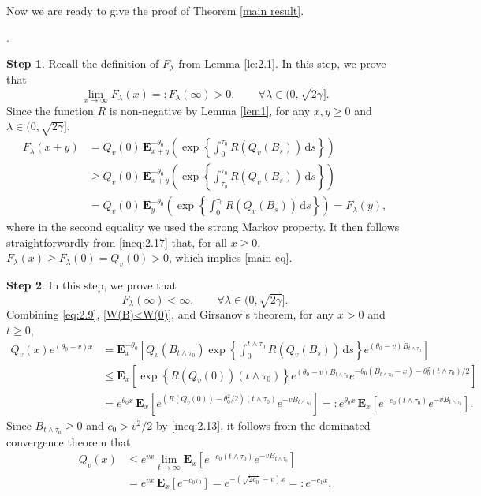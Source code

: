\documentclass[10pt,a4paper]{amsart}
\numberwithin{equation}{section}
\begin{document}
\bigskip 
Now we are ready to give the proof of Theorem \ref{main result}.
\bigskip 


. 

{\bf Step 1}. 
Recall the definition of $F_\lambda$ from Lemma \ref{le:2.1}. In this step, we prove that
\begin{equation}\label{main eq}
	\lim_{x \to \infty} F_\lambda(x) =: F_\lambda(\infty) > 0, \qquad \forall \lambda \in (0, \sqrt{2\gamma}].
\end{equation}
Since the function $R$ is non-negative by Lemma \ref{lem1}, for any $x, y \ge 0$ and $\lambda \in (0, \sqrt{2\gamma}]$,
\begin{align}\label{ineq:2.17}
	F_\lambda(x + y)
	&= Q_v(0) \, \mathbf E_{x+y}^{-\theta_0} \left( \exp\left\{ \int_0^{\tau_0} R(Q_v(B_s)) \, \mathrm{d}s \right\} \right) \nonumber \\
	&\ge Q_v(0) \, \mathbf E_{x+y}^{-\theta_0} \left( \exp\left\{ \int_{\tau_y}^{\tau_0} R(Q_v(B_s)) \, \mathrm{d}s \right\} \right) \nonumber \\
	&= Q_v(0) \, \mathbf E_y^{-\theta_0} \left( \exp\left\{ \int_0^{\tau_0} R(Q_v(B_s)) \, \mathrm{d}s \right\} \right) = F_\lambda(y),
\end{align}
where in the second equality we used the strong Markov property. It then follows straightforwardly from \eqref{ineq:2.17} that, for all $x \ge 0$, $F_\lambda(x) \ge F_\lambda(0) = Q_v(0) > 0$, which implies \eqref{main eq}.

{\bf Step 2}. In this step, we prove that
\begin{equation}\label{main eq2}
	F_\lambda(\infty) < \infty, \qquad \forall \lambda \in (0, \sqrt{2\gamma}].
\end{equation}
Combining \eqref{eq:2.9}, \eqref{W(B)<W(0)}, and Girsanov's theorem, for any $x > 0$ and $t \ge 0$,
\begin{align*}
	Q_v(x)
	 e^{(\theta_0 - v)x}
	&= \mathbf E_x^{-\theta_0}
	\left[
	Q_v(B_{t \wedge \tau_0}) \exp\left\{ \int_0^{t \wedge \tau_0} R(Q_v(B_s)) \, \mathrm{d}s \right\}
	e^{(\theta_0 - v) B_{t \wedge \tau_0}}
	\right] \nonumber \\
	&\le \mathbf E_x
	\left[
	\exp\left\{ R(Q_v(0)) (t \wedge \tau_0) \right\}
	e^{(\theta_0 - v) B_{t \wedge \tau_0}}
	e^{-\theta_0 (B_{t \wedge \tau_0} - x) - \theta_0^2 (t \wedge \tau_0)/2}
	\right] \nonumber \\
	&= e^{\theta_0 x} \, \mathbf E_x
	\left[ e^{(R(Q_v(0)) - \theta_0^2/2)(t \wedge \tau_0)} e^{-v B_{t \wedge \tau_0}} \right]
	=: e^{\theta_0 x} \, \mathbf E_x
	\left[ e^{-c_0 (t \wedge \tau_0)} e^{-v B_{t \wedge \tau_0}} \right].
\end{align*}
Since $B_{t \wedge \tau_0} \ge 0$ and $c_0 > v^2/2$ by \eqref{ineq:2.13}, it follows from the dominated convergence theorem that
\begin{align}
	Q_v(x)
	 &\le e^{v x} \lim_{t \to \infty} \mathbf E_x
	\left[ e^{-c_0 (t \wedge \tau_0)} e^{-v B_{t \wedge \tau_0}} \right] \nonumber \\
	&= e^{v x} \, \mathbf E_x \left[ e^{-c_0 \tau_0} \right]
	= e^{-(\sqrt{2c_0} - v)x} =: e^{-c_1 x}.
\end{align}
\end{document}
